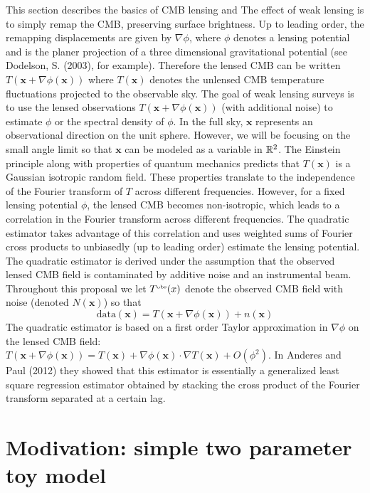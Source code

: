 \documentclass[11pt]{article}
\newcommand{\bx}{\boldsymbol x}
\begin{document}
This section describes the  basics of CMB lensing and 
 The effect of weak lensing is to simply remap the CMB, preserving surface brightness.   Up to leading order, the remapping  displacements are given by $\nabla \phi$, where $\phi$ denotes a lensing potential and is the planer projection of a three dimensional gravitational potential (see Dodelson, S. (2003), for example). Therefore the lensed CMB can  be written $T(\bx + \nabla \phi(\bx))$ where $T(\bx)$ denotes the unlensed CMB temperature fluctuations projected to the observable sky.
The goal of weak lensing surveys is to use the lensed observations $T(\bx + \nabla \phi(\bx))$  (with additional noise) to  estimate $\phi$ or the spectral density of $\phi$. 
 In the full sky, $\bx$ represents an observational direction on the unit sphere. However, we will be focusing on the small angle limit  so that $\bx$ can be modeled as a variable in $ \Bbb R^2$.  The Einstein principle along with properties of quantum mechanics predicts that $T(\bx)$   is a Gaussian  isotropic random field. These properties translate to  the independence of the Fourier transform of $T$ across different frequencies.
 However, for a fixed lensing potential $\phi$, the lensed CMB  becomes non-isotropic, which leads to a correlation in the Fourier transform across different frequencies. The quadratic estimator   takes advantage of this correlation and uses weighted sums of Fourier  cross products to unbiasedly (up to leading order) estimate the lensing potential.
The quadratic estimator is derived under the assumption that the observed lensed CMB field is contaminated by additive noise and an instrumental beam. Throughout this proposal we let  $T^\text{\tiny obs}(x)$ denote the observed CMB field  with  noise (denoted $N(\bx)$) so that  
\[ \text{data}(\bx)= T(\bx + \nabla \phi(\bx))+ n(\bx)
 \]
The quadratic estimator is based on a first order Taylor approximation in $\nabla \phi $ on the lensed CMB field:
$T(\bx+\nabla \phi(\bx))= T(\bx) + \nabla \phi(\bx)\cdot \nabla T(\bx)+ O(\phi^2)$. 
In Anderes and Paul (2012) they showed that this estimator is essentially  a generalized least square regression estimator obtained by stacking the cross product of the Fourier transform separated at a certain lag.


%
%
\section{Modivation: simple two parameter toy model}
\label{two parameter system}
\end{document}
